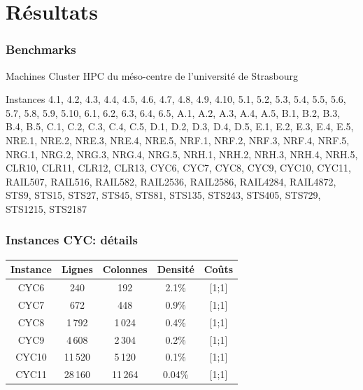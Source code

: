 \documentclass[11pt]{beamer}
\begin{document}
	\section{Résultats}
		\begin{frame}
			\frametitle{Benchmarks}
			\begin{block}{Machines}
				Cluster HPC du méso-centre de l'université de Strasbourg
			\end{block}
			\begin{block}{Instances}
				4.1, 4.2, 4.3, 4.4, 4.5, 4.6, 4.7, 4.8, 4.9, 4.10, 5.1, 5.2, 5.3, 5.4, 5.5, 5.6, 5.7, 5.8, 5.9, 5.10, 6.1, 6.2, 6.3, 6.4, 6.5, A.1, A.2, A.3, A.4, A.5, B.1, B.2, B.3, B.4, B.5, C.1, C.2, C.3, C.4, C.5, D.1, D.2, D.3, D.4, D.5, E.1, E.2, E.3, E.4, E.5, NRE.1, NRE.2, NRE.3, NRE.4, NRE.5, NRF.1, NRF.2, NRF.3, NRF.4, NRF.5, NRG.1, NRG.2, NRG.3, NRG.4, NRG.5, NRH.1, NRH.2, NRH.3, NRH.4, NRH.5, CLR10, CLR11, CLR12, CLR13, CYC6, CYC7, CYC8, CYC9, CYC10, CYC11, RAIL507, RAIL516, RAIL582, RAIL2536, RAIL2586, RAIL4284, RAIL4872, STS9, STS15, STS27, STS45, STS81, STS135, STS243, STS405, STS729, STS1215, STS2187
			\end{block}
		\end{frame}
		\begin{frame}
			\frametitle{Instances CYC: détails}
			\centering
			\begin{tabular}{ccccc}
				\toprule
				Instance & Lignes & Colonnes & Densité & Coûts\\
				\midrule
				CYC6 & 240 & 192 & 2.1\% & [1;1]\\
				CYC7 & 672 & 448 & 0.9\% & [1;1]\\
				CYC8 & 1\,792 & 1\,024 & 0.4\% & [1;1]\\
				CYC9 & 4\,608 & 2\,304 & 0.2\% & [1;1]\\
				CYC10 & 11\,520 & 5\,120 & 0.1\% & [1;1]\\
				CYC11 & 28\,160 & 11\,264 & 0.04\% & [1;1]\\
				\bottomrule
			\end{tabular}
		\end{frame}
\end{document}
